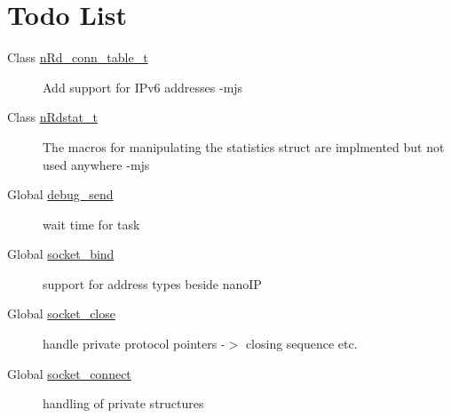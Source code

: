 \hypertarget{todo}{}\section{Todo List}\label{todo}
\label{todo__todo000008}
\hypertarget{todo__todo000008}{}
 \begin{description}
\item[Class \hyperlink{structnRd__conn__table__t}{n\-Rd\_\-conn\_\-table\_\-t} ]Add support for IPv6 addresses -mjs \end{description}


\label{todo__todo000007}
\hypertarget{todo__todo000007}{}
 \begin{description}
\item[Class \hyperlink{structnRdstat__t}{n\-Rdstat\_\-t} ]The macros for manipulating the statistics struct are implmented but not used anywhere -mjs \end{description}


\label{todo__todo000004}
\hypertarget{todo__todo000004}{}
 \begin{description}
\item[Global \hyperlink{debug_8h_658bb373a72c43fa6a070e2380e24059}{debug\_\-send} ]wait time for task

\end{description}


\label{todo__todo000002}
\hypertarget{todo__todo000002}{}
 \begin{description}
\item[Global \hyperlink{socket_8h_005740d957ab5d95ffb1448079c18c5f}{socket\_\-bind} ]support for address types beside nano\-IP

\end{description}


\label{todo__todo000001}
\hypertarget{todo__todo000001}{}
 \begin{description}
\item[Global \hyperlink{socket_8h_14f3b4a63186d93cd3ddb1f2a4120377}{socket\_\-close} ]handle private protocol pointers -$>$ closing sequence etc.

\end{description}


\label{todo__todo000003}
\hypertarget{todo__todo000003}{}
 \begin{description}
\item[Global \hyperlink{socket_8h_73cfc659f1503e0cf5773933b972944e}{socket\_\-connect} ]handling of private structures

\end{description}


